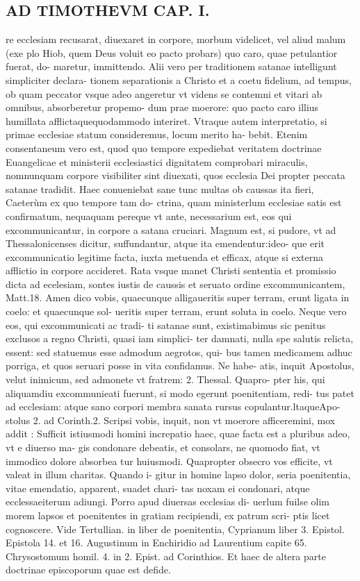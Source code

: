 \documentclass{article}
\begin{document}
\begin{pages}
\section*{AD TIMOTHEVM CAP. I. }
\marginpar{[ p.63 ]}\pstart re ecclesiam recusarat, diuexaret in corpore, morbum videlicet, vel aliud malum (exe plo Hiob, quem Deus voluit eo pacto probars) quo caro, quae petulantior fuerat, do- maretur, immittendo. Alii vero per traditionem satanae intelligunt simpliciter declara- tionem separationis a Christo et a coetu fidelium, ad tempus, ob quam peccator vsque  adeo angeretur vt videns se contemni et vitari ab omnibus, absorberetur propemo- dum prae moerore: quo pacto caro illius humillata afflictaquequodammodo interiret. Vtraque  autem interpretatio, si primae ecclesiae statum consideremus, locum merito ha- bebit. Etenim consentaneum vero est, quod quo tempore expediebat veritatem doctrinae Euangelicae et ministerii ecclesiastici dignitatem comprobari miraculis, nomnunquam corpore visibiliter sint diuexati, quos ecclesia Dei propter peccata satanae tradidit. Haec conueniebat sane tunc multas ob caussas ita fieri, Caeterùm ex quo tempore tam do- ctrina, quam ministerlum ecclesiae satis est confirmatum, nequaquam pereque vt ante, necessarium est, eos qui excommunicantur, in corpore a satana cruciari. Magnum est, si pudore, vt ad Thessalonicenses dicitur, suffundantur, atque ita emendentur:ideo- que erit excommunicatio legitime facta, iuxta metuenda et efficax, atque si externa afflictio in corpore accideret. Rata vsque  manet Christi sententia et promissio dicta ad ecelesiam, sontes iustis de caussis et seruato ordine excommunicantem, Matt.18. Amen dico vobis, quaecunque  alligaueritis super terram, erunt ligata in coelo: et quaecunque  sol- ueritis super terram, erunt soluta in coelo. Neque  vero eos, qui excommunicati ac tradi- ti satanae sunt, existimabimus sic penitus exclusos a regno Christi, quasi iam simplici- ter damnati, nulla spe salutis relicta, essent: sed statuemus esse admodum aegrotos, qui- bus tamen medicamem adhuc porriga, et quos seruari posse in vita confidamus. Ne habe- atis, inquit Apostolus, velut inimicum, sed admonete vt fratrem: 2. Thessal. Quapro- pter his, qui aliquamdiu excommunieati fuerunt, si modo egerunt poenitentiam, redi- tus patet ad ecclesiam: atque  sano corpori membra sanata rursus copulantur.ltaqueApo- stolus 2. ad Corinth.2. Scripsi vobis, inquit, non vt moerore afficeremini, mox addit : Sufficit istiusmodi homini increpatio haec, quae facta est a pluribus  adeo, vt e diuerso ma- gis condonare debeatis, et consolars, ne quomodo fiat, vt immodico dolore absorbea tur huiusmodi. Quapropter obsecro vos efficite, vt valeat in illum charitas. Quando i- gitur in homine lapso dolor, seria poenitentia, vitae emendatio, apparent, suadet chari- tas noxam ei condonari, atque  ecclessaeiterum adiungi. Porro apud diuersas ecclesias di- uerlum fuilse olim morem lapsos et poenitentes in gratiam recipiendi, ex patrum scri- ptis licet cognoscere. Vide Tertullian. in liber  de poenitentia, Cyprianum liber  3. Epistol. Epistola 14. et 16. Augustinum in Enchiridio ad Laurentium capite 65. Chrysostomum homil. 4. in 2. Epist. ad Corinthios. Et haec de altera parte doctrinae episcoporum quae est defide.  \pend

\end{pages}
\end{document}

